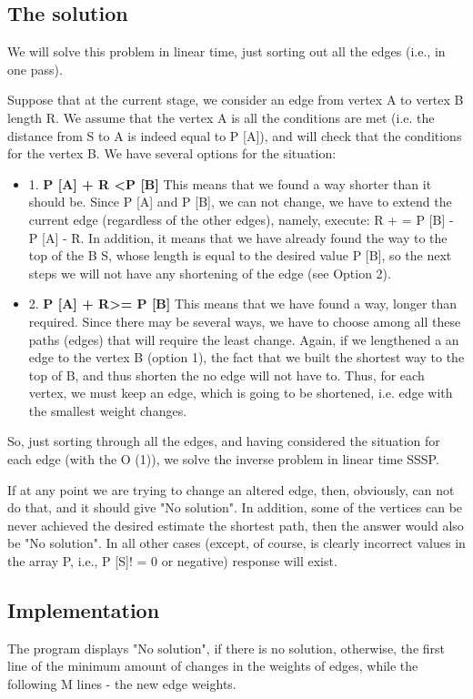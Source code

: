 \subsection{ The solution }
We will solve this problem in linear time, just sorting out all the edges (i.e., in one pass).

Suppose that at the current stage, we consider an edge from vertex A to vertex B length R. We assume that the vertex A is all the conditions are met (i.e. the distance from S to A is indeed equal to P [A]), and will check that the conditions for the vertex B. We have several options for the situation:

\begin{itemize} \item 1. \textbf{P [A] + R <P [B]} 
This means that we found a way shorter than it should be. Since P [A] and P [B], we can not change, we have to extend the current edge (regardless of the other edges), namely, execute: 
R + = P [B] - P [A] - R. 
In addition, it means that we have already found the way to the top of the B S, whose length is equal to the desired value P [B], so the next steps we will not have any shortening of the edge (see Option 2). \item 2. \textbf{P [A] + R>= P [B]} 
This means that we have found a way, longer than required. Since there may be several ways, we have to choose among all these paths (edges) that will require the least change. Again, if we lengthened a an edge to the vertex B (option 1), the fact that we built the shortest way to the top of B, and thus shorten the no edge will not have to. Thus, for each vertex, we must keep an edge, which is going to be shortened, i.e. edge with the smallest weight changes. \end{itemize}
So, just sorting through all the edges, and having considered the situation for each edge (with the O (1)), we solve the inverse problem in linear time SSSP.

If at any point we are trying to change an altered edge, then, obviously, can not do that, and it should give "No solution". In addition, some of the vertices can be never achieved the desired estimate the shortest path, then the answer would also be "No solution". In all other cases (except, of course, is clearly incorrect values ​​in the array P, i.e., P [S]! = 0 or negative) response will exist.

\subsection{ Implementation }
The program displays "No solution", if there is no solution, otherwise, the first line of the minimum amount of changes in the weights of edges, while the following M lines - the new edge weights.

